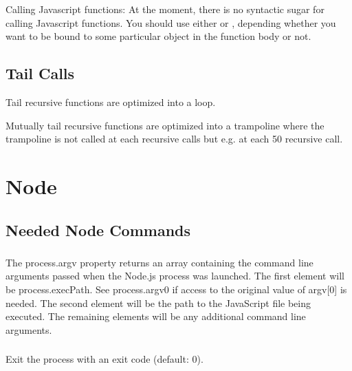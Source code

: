 Calling Javascript functions: At the moment, there is no syntactic sugar for
calling Javascript functions. You should use either  or
, depending whether you want  to be bound
to some particular object in the function body or not.


\subsection{Tail Calls}

Tail recursive functions are optimized into a loop.

Mutually tail recursive functions are optimized into a trampoline where the
trampoline is not called at each recursive calls but e.g. at each 50 recursive
call.









\section{Node}


\subsection{Needed Node Commands}

\subsubsection{}

The process.argv property returns an array containing the command line
arguments passed when the Node.js process was launched. The first element will
be process.execPath. See process.argv0 if access to the original value of
argv[0] is needed. The second element will be the path to the JavaScript file
being executed. The remaining elements will be any additional command line
arguments.



\subsubsection{}

Exit the process with an exit code (default: 0).

\subsubsection{}

